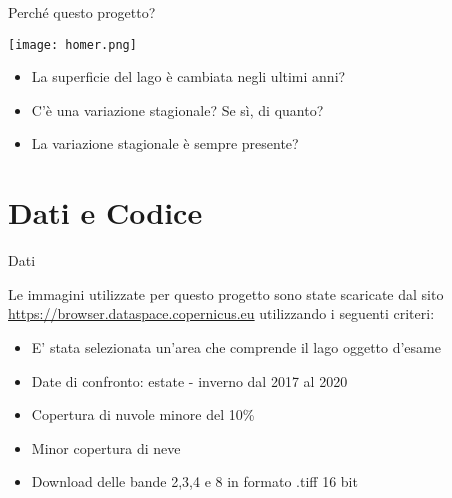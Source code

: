 \documentclass{beamer} %
\begin{document}
        \begin{frame}{Perché questo progetto?}
            \begin{multicols}{2}                
                \begin{center}
                    \texttt{[image: homer.png]}
                \end{center}
            \columnbreak
                \begin{itemize}
                    \item La superficie del lago è cambiata negli ultimi anni?
                    \item C'è una variazione stagionale? Se sì, di quanto?
                    \item La variazione stagionale è sempre presente?
                \end{itemize}
            \end{multicols}
        \end{frame}


\section{Dati e Codice}


        \begin{frame}{Dati}
            \begin{center}
            Le immagini utilizzate per questo progetto sono state scaricate dal sito \url{https://browser.dataspace.copernicus.eu} utilizzando i seguenti criteri:
                \begin{itemize}
                    \item E' stata selezionata un'area che comprende il lago oggetto d'esame
                    \item Date di confronto: estate - inverno dal 2017 al 2020
                    \item Copertura di nuvole minore del 10\%
                    \item Minor copertura di neve
                    \item Download delle bande 2,3,4 e 8 in formato .tiff 16 bit
                \end{itemize}
            \end{center}
        \end{frame}
\end{document}
